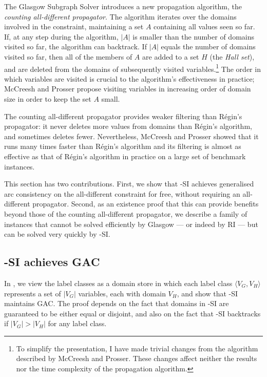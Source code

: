 The Glasgow Subgraph Solver \cite{DBLP:conf/cp/McCreeshP15} introduces a new propagation algorithm,
the \emph{counting all-different propagator}.
The algorithm iterates over the domains involved in the constraint, maintaining a set $A$ containing
all values seen so far.  If, at any step during the algorithm, $|A|$ is smaller than the number
of domains visited so far, the algorithm can backtrack.  If $|A|$ equals the number of domains visited
so far, then all of the members of $A$ are added to a set $H$ (the \emph{Hall set}), and are deleted from
the domains of subsequently visited variables.\footnote{To simplify the presentation,
I have made trivial changes from the algorithm described by McCreesh and Prosser.
These changes affect neither the results nor the time complexity of the propagation algorithm.}
The order in which variables are visited is crucial
to the algorithm's effectiveness in practice; McCreesh and Prosser
propose visiting variables in increasing order of domain size in order to keep the set $A$ small.

The counting all-different propagator provides weaker filtering than
R\'egin's propagator: it never deletes more values from domains than R\'egin's algorithm, and sometimes
deletes fewer. Nevertheless, McCreesh and Prosser showed that it runs many times faster than
R\'egin's algorithm and its filtering is almost as effective as that of R\'egin's algorithm in practice
on a large set of benchmark instances.

This section has two contributions. First, we show that \McSplit-SI achieves generalised arc consistency
on the all-different constraint for free, without requiring an all-different propagator.
Second, as an existence proof that this can provide benefits beyond those of the counting all-different
propagator, we describe
a family of instances that cannot be solved efficiently by Glasgow --- or indeed by RI --- but can
be solved very quickly by \McSplit-SI.

\subsection{\McSplit-SI achieves GAC}

In , we view the label classes as a domain store in which each label
class $\langle V_G, V_H \rangle$ represents a set of $|V_G|$ variables, each with domain $V_H$,
and show that \McSplit-SI maintains GAC.  The proof depends on the fact that domains in
\McSplit-SI are guaranteed to be
either equal or disjoint, and also on the fact that \McSplit-SI backtracks if $|V_G| > |V_H|$
for any label class.

